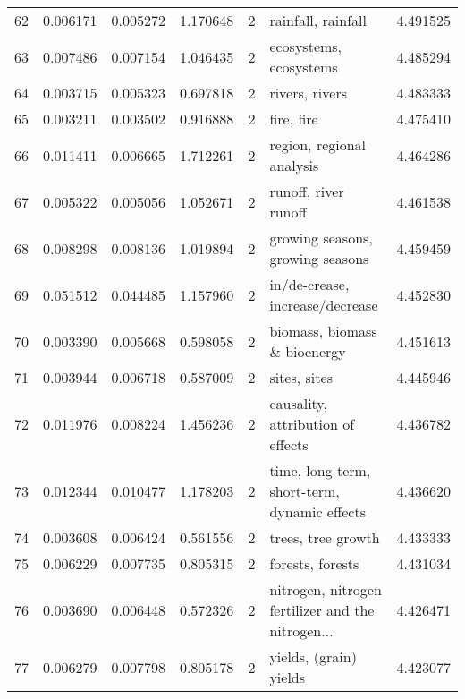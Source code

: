 \begin{tabular}{lrrrrlr}
62  &    0.006171 &  0.005272 &        1.170648 &           2 &                                 rainfall, rainfall &  4.491525 \\
63  &    0.007486 &  0.007154 &        1.046435 &           2 &                             ecosystems, ecosystems &  4.485294 \\
64  &    0.003715 &  0.005323 &        0.697818 &           2 &                                     rivers, rivers &  4.483333 \\
65  &    0.003211 &  0.003502 &        0.916888 &           2 &                                         fire, fire &  4.475410 \\
66  &    0.011411 &  0.006665 &        1.712261 &           2 &                          region, regional analysis &  4.464286 \\
67  &    0.005322 &  0.005056 &        1.052671 &           2 &                               runoff, river runoff &  4.461538 \\
68  &    0.008298 &  0.008136 &        1.019894 &           2 &                   growing seasons, growing seasons &  4.459459 \\
69  &    0.051512 &  0.044485 &        1.157960 &           2 &                    in/de-crease, increase/decrease &  4.452830 \\
70  &    0.003390 &  0.005668 &        0.598058 &           2 &                       biomass, biomass \& bioenergy &  4.451613 \\
71  &    0.003944 &  0.006718 &        0.587009 &           2 &                                       sites, sites &  4.445946 \\
72  &    0.011976 &  0.008224 &        1.456236 &           2 &                  causality, attribution of effects &  4.436782 \\
73  &    0.012344 &  0.010477 &        1.178203 &           2 &       time, long-term, short-term, dynamic effects &  4.436620 \\
74  &    0.003608 &  0.006424 &        0.561556 &           2 &                                 trees, tree growth &  4.433333 \\
75  &    0.006229 &  0.007735 &        0.805315 &           2 &                                   forests, forests &  4.431034 \\
76  &    0.003690 &  0.006448 &        0.572326 &           2 &  nitrogen, nitrogen fertilizer and the nitrogen... &  4.426471 \\
77  &    0.006279 &  0.007798 &        0.805178 &           2 &                             yields, (grain) yields &  4.423077 \\

\end{tabular}
